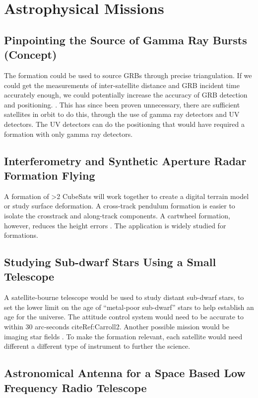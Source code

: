 \section{Astrophysical Missions}

\subsection{Pinpointing the Source of Gamma Ray Bursts (Concept)}

The formation could be used to source GRBs through precise triangulation. If we could get the measurements of inter-satellite distance and GRB incident time accurately enough, we could potentially increase the accuracy of GRB detection and positioning. \cite{Ref:Dill}. This has since been proven unnecessary, there are sufficient satellites in orbit to do this, through the use of gamma ray detectors and UV detectors. The UV detectors can do the positioning that would have required a formation with only gamma ray detectors. 

\subsection{Interferometry and Synthetic Aperture Radar Formation Flying}

A formation of >2 CubeSats will work together to create a digital
terrain model or study surface deformation. A cross-track pendulum
formation is easier to isolate the crosstrack and along-track components. A cartwheel formation, however, reduces the height errors \cite{Ref:Peterson}. The application is widely studied for formations. 

\subsection{Studying Sub-dwarf Stars Using a Small Telescope}

A satellite-bourne telescope would be used to study distant sub-dwarf stars, to set the lower limit on the age of ``metal-poor sub-dwarf'' stars to help establish an age for the universe. The attitude control system would need to be accurate to within 30 arc-seconds cite{Ref:Carroll2}. Another possible mission would be imaging star fields \cite{Ref:Nicholas}. To make the formation relevant, each satellite would need different a different type of instrument to further the science. 

\subsection{Astronomical Antenna for a Space Based Low Frequency Radio Telescope}

